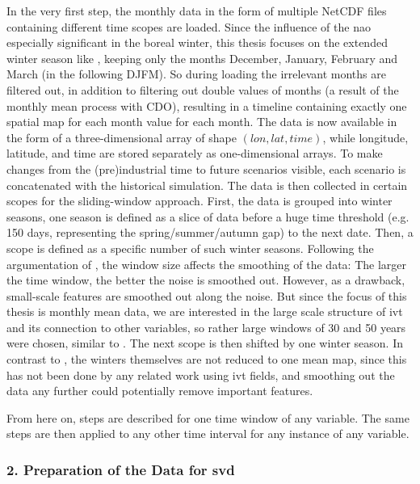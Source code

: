 In the very first step, the monthly data in the form of multiple NetCDF files containing different time scopes are loaded. 
Since the influence of the \ac{nao} especially significant in the boreal winter, this thesis focuses on the extended winter season like \cite{vietinghoff_visual_2021}, keeping only the months December, January, February and March (in the following DJFM). 
So during loading the irrelevant months are filtered out, in addition to filtering out double values of months (a result of the monthly mean process with CDO), resulting in a timeline containing exactly one spatial map for each month value for each month. 
The data is now available in the form of a three-dimensional array of shape $(lon, lat, time)$, while longitude, latitude, and time are stored separately as one-dimensional arrays. 
To make changes from the (pre)industrial time to future scenarios visible, each scenario is concatenated with the historical simulation. 
The data is then collected in certain scopes for the sliding-window approach. 
First, the data is grouped into winter seasons, one season is defined as a slice of data before a huge time threshold (e.g. 150 days, representing the spring/summer/autumn gap) to the next date. 
Then, a scope is defined as a specific number of such winter seasons.
Following the argumentation of , the window size affects the smoothing of the data: The larger the time window, the better the noise is smoothed out.
However, as a drawback, small-scale features are smoothed out along the noise. 
But since the focus of this thesis is monthly mean data, we are interested in the large scale structure of \ac{ivt} and its connection to other variables, so rather large windows of 30 and 50 years were chosen, similar to .  
The next scope is then shifted by one winter season. 
In contrast to \cite{vietinghoff_visual_2021}, the winters themselves are not reduced to one mean map, since this has not been done by any related work using \ac{ivt} fields, and smoothing out the data any further could potentially remove important features. 


From here on, steps are described for one time window of any variable. 
The same steps are then applied to any other time interval for any instance of any variable.


\subsubsection{2. Preparation of the Data for \ac{svd}}

